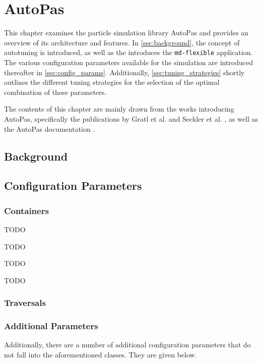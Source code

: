 \chapter[AutoPas]{AutoPas}
\label{cp:autopas}

{
	\parindent0pt
	This chapter examines the particle simulation library AutoPas and provides an overview of its architecture and features. In \autoref{sec:background}, the concept of autotuning is introduced, as well as the  introduces the \texttt{md-flexible} application.
	The various configuration parameters available for the simulation are introduced thereafter in \autoref{sec:config_params}. Additionally, \autoref{sec:tuning_strategies} shortly outlines the different tuning strategies for the selection of the optimal combination of these parameters.
	
	The contents of this chapter are mainly drawn from the works introducing AutoPas, specifically the publications by Gratl et al. \cite{Gratl2019, Gratl2021} and Seckler et al. \cite{Seckler2021}, as well as the AutoPas documentation \cite{AutoPas2025}.
}


\section{Background}
\label{sec:background}

\section{Configuration Parameters}
\label{sec:config_params}
\subsection{Containers}
\begin{description}[leftmargin=!,labelwidth=\widthof{\textbf{Verlet Cluster List }}]
	\item[\textbf{Direct Sum}] TODO
	\item[\textbf{Linked Cells}] TODO
	\item[\textbf{Verlet Lists}] TODO %
	\item[\textbf{Verlet Cluster Lists}] TODO %
\end{description}
\subsection{Traversals}
\subsection{Additional Parameters}
Additionally, there are a number of additional configuration parameters that do not fall into the aforementioned classes. They are given below.


